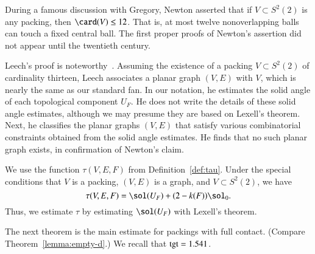 \documentclass{llncs}
\def\op#1{{\hbox{#1}}}
\begin{document}
\begin{remark}
During a famous discussion with Gregory, Newton asserted that 
if $V\subset S^2(2)$ is any packing, then $\card(V)\le 12$. That is, at most
twelve nonoverlapping balls can touch a fixed central ball.  The first proper
proofs of Newton's assertion did not appear until the twentieth century.
%
%
%
%
  
 Leech's proof is
noteworthy~\cite{Leech:1956:MG}.  Assuming the existence of a packing
$V\subset S^2(2)$ of cardinality thirteen, Leech associates a planar graph
$(V,E)$ with $V$, which is nearly the same as our standard fan.  In
our notation, he estimates the solid angle of each topological
component $U_F$.  He does not write the details of these solid angle
estimates, although we may presume they are based on Lexell's theorem.
Next, he classifies the planar graphs $(V,E)$ that satisfy various
combinatorial constraints obtained from the solid angle estimates. He
finds that no such planar graph exists, in confirmation of Newton's
claim.
\end{remark}

We use the function $\tau(V,E,F)$ from Definition~\ref{def:tau}.  Under the 
special conditions that 
$V$ is a packing, $(V,E)$ is a  graph, and
$V\subset S^2(2)$, we have 
\[
\tau(V,E,F) = \sol(U_F) + (2-k(F)) \sol_0.
\]
Thus, we estimate $\tau$ by estimating $\sol(U_F)$ with Lexell's theorem.



The next theorem is the main estimate for packings with full contact.
(Compare  Theorem~\ref{lemma:empty-d}.)  
We recall that $\op{tgt}=1.541$.
%
\indy{Notation}{tgt@$\op{tgt}=1.541$}%
\end{document}

